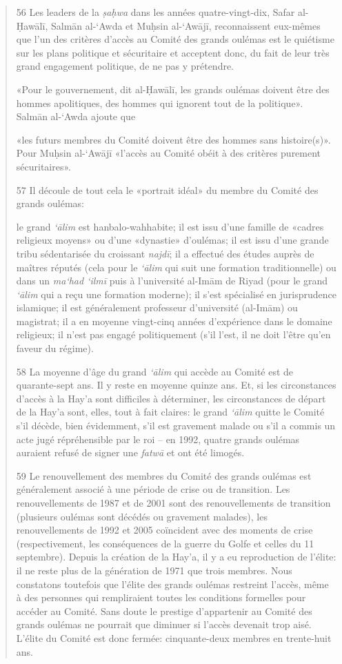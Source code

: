 \begin{quote}
56 Les leaders de la \emph{ṣaḥwa} dans les années quatre-vingt-dix,
Safar al-Ḥawālī, Salmān al-`Awda et Muḥsin al-`Awājī, reconnaissent
eux-mêmes que l'un des critères d'accès au Comité des grands oulémas est
le quiétisme sur les plans politique et sécuritaire et acceptent donc,
du fait de leur très grand engagement politique, de ne pas y prétendre.

«Pour le gouvernement, dit al-Ḥawālī, les grands oulémas doivent être
des hommes apolitiques, des hommes qui ignorent tout de la politique».
Salmān al-`Awda ajoute que

«les futurs membres du Comité doivent être des hommes sans histoire(s)».
Pour Muḥsin al-`Awājī «l'accès au Comité obéit à des critères purement
sécuritaires».

57 Il découle de tout cela le «portrait idéal» du membre du Comité des
grands oulémas:

le grand \emph{`ālim} est hanbalo-wahhabite; il est issu d'une famille
de «cadres religieux moyens» ou d'une «dynastie» d'oulémas; il est issu
d'une grande tribu sédentarisée du croissant \emph{najdī}; il a effectué
des études auprès de maîtres réputés (cela pour le \emph{`ālim} qui suit
une formation traditionnelle) ou dans un \emph{ma`had `ilmī} puis à
l'université al-Imām de Riyad (pour le grand \emph{`ālim} qui a reçu une
formation moderne); il s'est spécialisé en jurisprudence islamique; il
est généralement professeur d'université (al-Imām) ou magistrat; il a en
moyenne vingt-cinq années d'expérience dans le domaine religieux; il
n'est pas engagé politiquement (s'il l'est, il ne doit l'être qu'en
faveur du régime).

58 La moyenne d'âge du grand \emph{`ālim} qui accède au Comité est de
quarante-sept ans. Il y reste en moyenne quinze ans. Et, si les
circonstances d'accès à la Hay'a sont difficiles à déterminer, les
circonstances de départ de la Hay'a sont, elles, tout à fait claires: le
grand \emph{`ālim} quitte le Comité s'il décède, bien évidemment, s'il
est gravement malade ou s'il a commis un acte jugé répréhensible par le
roi -- en 1992, quatre grands oulémas auraient refusé de signer une
\emph{fatwā} et ont été limogés.

59 Le renouvellement des membres du Comité des grands oulémas est
généralement associé à une période de crise ou de transition. Les
renouvellements de 1987 et de 2001 sont des renouvellements de
transition (plusieurs oulémas sont décédés ou gravement malades), les
renouvellements de 1992 et 2005 coïncident avec des moments de crise
(respectivement, les conséquences de la guerre du Golfe et celles du 11
septembre). Depuis la création de la Hay'a, il y a eu reproduction de
l'élite: il ne reste plus de la génération de 1971 que trois membres.
Nous constatons toutefois que l'élite des grands oulémas restreint
l'accès, même à des personnes qui rempliraient toutes les conditions
formelles pour accéder au Comité. Sans doute le prestige d'appartenir au
Comité des grands oulémas ne pourrait que diminuer si l'accès devenait
trop aisé. L'élite du Comité est donc fermée: cinquante-deux membres en
trente-huit ans.
\end{quote}

